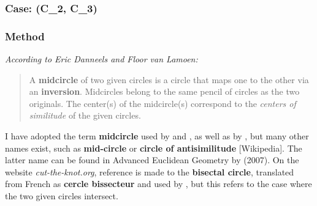 \subsubsection{Case: (C\_2, C\_3)}
\label{ssub:CCC_gergonne}


\begin{tkzexample}[vbox]
\begin{center}
\end{center}
\end{tkzexample}

\subsubsection{Method }
\label{ssub:midcircle}

\medskip

\emph{According to Eric Danneels and Floor van Lamoen:}

\begin{quote}
A \textbf{midcircle} of two given circles is a circle that maps one to the other via an \textbf{inversion}. Midcircles belong to the same pencil of circles as the two originals. The center(s) of the midcircle(s) correspond to the \emph{centers of similitude} of the given circles.
\end{quote}

I have adopted the term \textbf{midcircle} used by  and , as well as by , but many other names exist, such as \textbf{mid-circle} or \textbf{circle of antisimilitude} [Wikipedia]. The latter name can be found in Advanced Euclidean Geometry by  (2007). On the website \textit{cut-the-knot.org}, reference is made to the \textbf{bisectal circle}, translated from French as \textbf{cercle bissecteur} and used by , but this refers to the case where the two given circles intersect.


